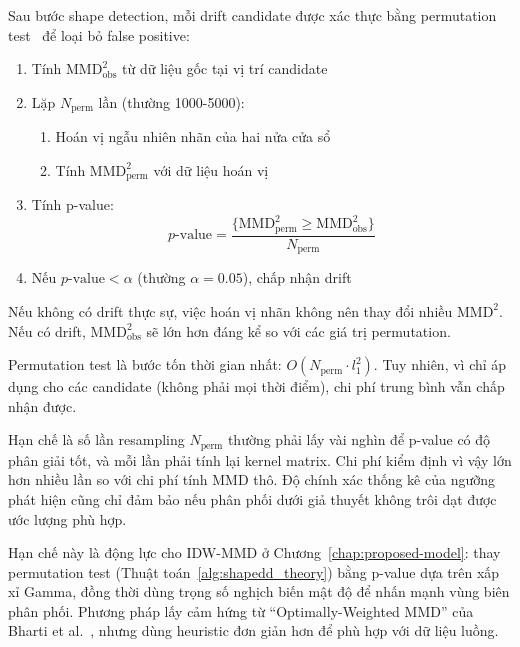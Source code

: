 Sau bước shape detection, mỗi drift candidate được xác thực bằng permutation test~\cite{good2000permutation} để loại bỏ false positive:

\begin{enumerate}
	\item Tính $\text{MMD}^2_{\text{obs}}$ từ dữ liệu gốc tại vị trí candidate
	\item Lặp $N_{\text{perm}}$ lần (thường 1000-5000):
	      \begin{enumerate}
		      \item Hoán vị ngẫu nhiên nhãn của hai nửa cửa sổ
		      \item Tính $\text{MMD}^2_{\text{perm}}$ với dữ liệu hoán vị
	      \end{enumerate}
	\item Tính p-value:
	      \begin{equation}
		      p\text{-value} = \frac{\{\text{MMD}^2_{\text{perm}} \geq \text{MMD}^2_{\text{obs}}\}}{N_{\text{perm}}}
	      \end{equation}
	\item Nếu $p\text{-value} < \alpha$ (thường $\alpha = 0.05$), chấp nhận drift
\end{enumerate}

Nếu không có drift thực sự, việc hoán vị nhãn không nên thay đổi nhiều $\text{MMD}^2$. Nếu có drift, $\text{MMD}^2_{\text{obs}}$ sẽ lớn hơn đáng kể so với các giá trị permutation.

Permutation test là bước tốn thời gian nhất: $O(N_{\text{perm}} \cdot l_1^2)$. Tuy nhiên, vì chỉ áp dụng cho các candidate (không phải mọi thời điểm), chi phí trung bình vẫn chấp nhận được.

Hạn chế là số lần resampling $N_{\text{perm}}$ thường phải lấy vài nghìn để p-value có độ phân giải tốt, và mỗi lần phải tính lại kernel matrix. Chi phí kiểm định vì vậy lớn hơn nhiều lần so với chi phí tính MMD thô. Độ chính xác thống kê của ngưỡng phát hiện cũng chỉ đảm bảo nếu phân phối dưới giả thuyết không trôi dạt được ước lượng phù hợp.

Hạn chế này là động lực cho IDW-MMD ở Chương~\ref{chap:proposed-model}: thay permutation test (Thuật toán~\ref{alg:shapedd_theory}) bằng p-value dựa trên xấp xỉ Gamma, đồng thời dùng trọng số nghịch biến mật độ để nhấn mạnh vùng biên phân phối. Phương pháp lấy cảm hứng từ ``Optimally-Weighted MMD'' của Bharti et al.~\cite{bharti2023owmmd}, nhưng dùng heuristic đơn giản hơn để phù hợp với dữ liệu luồng.

